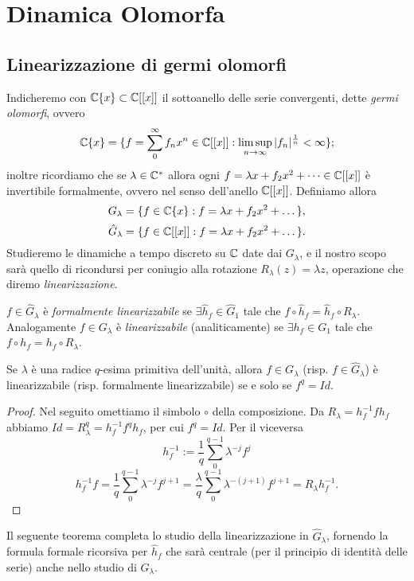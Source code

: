 \section{Dinamica Olomorfa}

\subsection{Linearizzazione di germi olomorfi}
Indicheremo con $\mathbb{C}\{x\}\subset\mathbb{C}[[x]]$ il sottoanello delle serie convergenti, dette \emph{germi olomorfi}, ovvero
\[\mathbb{C}\{x\}=\{ f=\sum_0^\infty f_n x^n\in \mathbb{C}[[x]]:\limsup_{n\rightarrow \infty}|f_n|^\frac{1}{n}<\infty \};\]
inoltre ricordiamo che se $\lambda\in\mathbb{C}^*$ allora ogni $f=\lambda x+f_2 x^2+\dots \in \mathbb{C}[[x]]$ è invertibile formalmente, ovvero nel senso dell'anello $\mathbb{C}[[x]]$. Definiamo allora
\[G_\lambda=\{f\in\mathbb{C}\{x\}:f=\lambda x+f_2 x^2+\dots\},\]
\[\hat G_\lambda=\{f\in\mathbb{C}[[x]]:f=\lambda x+f_2 x^2+\dots\}.\]
Studieremo le dinamiche a tempo discreto su $\mathbb{C}$ date dai $G_\lambda$, e il nostro scopo sarà quello di ricondursi per coniugio alla rotazione $R_\lambda(z)=\lambda z$, operazione che diremo \emph{linearizzazione}.

\begin{defi} $f\in \hat G_\lambda$ è \emph{formalmente linearizzabile} se $\exists \hat h_f\in \hat G_1$ tale che $f\circ\hat h_f=\hat h_f\circ R_\lambda$. Analogamente $f\in G_\lambda$ è \emph{linearizzabile} (analiticamente) se $\exists h_f\in G_1$ tale che $f\circ h_f= h_f\circ R_\lambda$. 
\end{defi}

\begin{teo}Se $\lambda$ è una radice $q$-esima primitiva dell'unità, allora $f\in G_\lambda$ (risp. $f\in \hat G_\lambda$) è linearizzabile (risp. formalmente linearizzabile) se e solo se $f^q=Id$.\end{teo}
\begin{proof}
Nel seguito omettiamo il simbolo $\circ$ della composizione.
 Da $R_\lambda=h_f^{-1}fh_f$ abbiamo $Id=R_\lambda^q=h_f^{-1}f^qh_f$, per cui $f^q=Id$. Per il viceversa
 \[h_f^{-1}:=\frac{1}{q}\sum_0^{q-1}\lambda^{-j}f^j\]
 \[h_f^{-1}f=\frac{1}{q}\sum_0^{q-1}\lambda^{-j}f^{j+1}=\frac{\lambda}{q}\sum_0^{q-1}\lambda^{-(j+1)}f^{j+1}=R_\lambda h_f^{-1}.\]
 \end{proof}

Il seguente teorema completa lo studio della linearizzazione in $\hat G_\lambda$, fornendo la formula formale ricorsiva per $\hat h_f$ che sarà centrale (per il principio di identità delle serie) anche nello studio di $G_\lambda$.

